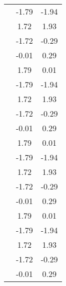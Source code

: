 \begin{table}
\begin{tabular}{c|cc|}
\multicolumn{1}{|c|}{} & \multicolumn{1}{|c|}{     -1.79} & \multicolumn{1}{|c|}{     -1.94} \\ 
\multicolumn{1}{|c|}{} & \multicolumn{1}{|c|}{      1.72} & \multicolumn{1}{|c|}{      1.93} \\ 
\multicolumn{1}{|c|}{} & \multicolumn{1}{|c|}{     -1.72} & \multicolumn{1}{|c|}{     -0.29} \\ 
\multicolumn{1}{|c|}{} & \multicolumn{1}{|c|}{     -0.01} & \multicolumn{1}{|c|}{      0.29} \\ 
\multicolumn{1}{|c|}{} & \multicolumn{1}{|c|}{      1.79} & \multicolumn{1}{|c|}{      0.01} \\ 
\multicolumn{1}{|c|}{} & \multicolumn{1}{|c|}{     -1.79} & \multicolumn{1}{|c|}{     -1.94} \\ 
\multicolumn{1}{|c|}{} & \multicolumn{1}{|c|}{      1.72} & \multicolumn{1}{|c|}{      1.93} \\ 
\multicolumn{1}{|c|}{} & \multicolumn{1}{|c|}{     -1.72} & \multicolumn{1}{|c|}{     -0.29} \\ 
\multicolumn{1}{|c|}{} & \multicolumn{1}{|c|}{     -0.01} & \multicolumn{1}{|c|}{      0.29} \\ 
\multicolumn{1}{|c|}{} & \multicolumn{1}{|c|}{      1.79} & \multicolumn{1}{|c|}{      0.01} \\ 
\multicolumn{1}{|c|}{} & \multicolumn{1}{|c|}{     -1.79} & \multicolumn{1}{|c|}{     -1.94} \\ 
\multicolumn{1}{|c|}{} & \multicolumn{1}{|c|}{      1.72} & \multicolumn{1}{|c|}{      1.93} \\ 
\multicolumn{1}{|c|}{} & \multicolumn{1}{|c|}{     -1.72} & \multicolumn{1}{|c|}{     -0.29} \\ 
\multicolumn{1}{|c|}{} & \multicolumn{1}{|c|}{     -0.01} & \multicolumn{1}{|c|}{      0.29} \\ 
\multicolumn{1}{|c|}{} & \multicolumn{1}{|c|}{      1.79} & \multicolumn{1}{|c|}{      0.01} \\ 
\multicolumn{1}{|c|}{} & \multicolumn{1}{|c|}{     -1.79} & \multicolumn{1}{|c|}{     -1.94} \\ 
\multicolumn{1}{|c|}{} & \multicolumn{1}{|c|}{      1.72} & \multicolumn{1}{|c|}{      1.93} \\ 
\multicolumn{1}{|c|}{} & \multicolumn{1}{|c|}{     -1.72} & \multicolumn{1}{|c|}{     -0.29} \\ 
\multicolumn{1}{|c|}{} & \multicolumn{1}{|c|}{     -0.01} & \multicolumn{1}{|c|}{      0.29} \\ 

\end{tabular}
\end{table}
